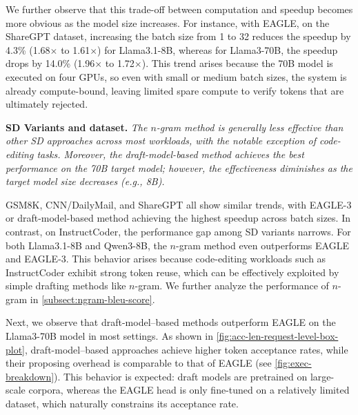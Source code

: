 \documentclass{article}
\newcommand{\jerry}[1]{\textcolor{cyan}{Jerry: #1}}
\begin{document}
We further observe that this trade-off between computation and speedup becomes more obvious as the model size increases. For instance, with EAGLE, on the ShareGPT dataset, increasing the batch size from 1 to 32 reduces the speedup by 4.3\% (1.68$\times$ to 1.61$\times$) for Llama3.1-8B, whereas for Llama3-70B, the speedup drops by 14.0\% (1.96$\times$ to 1.72$\times$). This trend arises because the 70B model is executed on four GPUs, so even with small or medium batch sizes, the system is already compute-bound, leaving limited spare compute to verify tokens that are ultimately rejected.


\begin{quoting}[leftmargin=1.5em, rightmargin=1.5em, vskip=0pt]
\textbf{SD Variants and dataset.}
\emph{
The $n$-gram method is generally less effective than other SD approaches across most workloads, with the notable exception of code-editing tasks. Moreover, the draft-model-based method achieves the best performance on the 70B target model; however, the effectiveness diminishes as the target model size decreases (e.g., 8B).}
\end{quoting}
GSM8K, CNN/DailyMail, and ShareGPT all show similar trends, with EAGLE-3 or draft-model-based method achieving the highest speedup across batch sizes. 
In contrast, on InstructCoder, the performance gap among SD variants narrows. For both Llama3.1-8B and Qwen3-8B, the $n$-gram method even outperforms EAGLE and EAGLE-3. This behavior arises because code-editing workloads such as InstructCoder exhibit strong token reuse, which can be effectively exploited by simple drafting methods like $n$-gram.
We further analyze the performance of $n$-gram in \autoref{subsect:ngram-bleu-score}.


Next, we observe that draft-model–based methods outperform EAGLE on the Llama3-70B model in most settings. As shown in \autoref{fig:acc-len-request-level-box-plot}, draft-model–based approaches achieve higher token acceptance rates, while their proposing overhead is comparable to that of EAGLE (see \autoref{fig:exec-breakdown}). This behavior is expected: draft models are pretrained on large-scale corpora, whereas the EAGLE head is only fine-tuned on a relatively limited dataset, which naturally constrains its acceptance rate.
\end{document}
